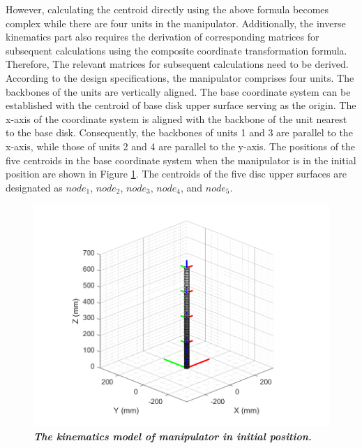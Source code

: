 However, calculating the centroid directly using the above formula becomes complex while there are four units in the manipulator. 
Additionally, the inverse kinematics part also requires the derivation of corresponding matrices for subsequent calculations 
using the composite coordinate transformation formula. Therefore, The relevant matrices for subsequent calculations need to 
be derived. \\
According to the design specifications, the manipulator comprises four units. The backbones of the units are vertically aligned. 
The base coordinate system can be established with the centroid of base disk upper surface serving as the origin. The x-axis of 
the coordinate system is aligned with the backbone of the unit nearest to the base disk. Consequently, the backbones of units 1 
and 3 are parallel to the x-axis, while those of units 2 and 4 are parallel to the y-axis. The positions of the five centroids 
in the base coordinate system when the manipulator is in the initial position are shown in Figure \ref{fig:kinematics model 0_0_0_0}. 
The centroids of the five disc upper surfaces are designated as $node_1$, $node_2$, $node_3$, $node_4$, and $node_5$. \\
\begin{figure}[H] %
    \centering %
    \captionsetup{labelsep=colon}
    \includegraphics[width=1.0\textwidth]{Image/MATLAB/manipulator_0_0_0_0.png} 
    \caption[The kinematics model of manipulator in the initial position]
    {\centering \textit{\textbf{The kinematics model of manipulator in initial position.}}}
    \label{fig:kinematics model 0_0_0_0}
\end{figure}
